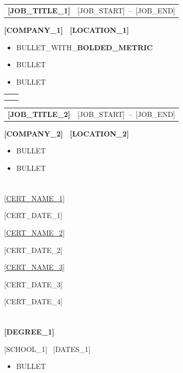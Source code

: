 \documentclass[10pt,a4paper]{article}
\makeatletter
\newenvironment{compactitem}{%
  \begin{itemize}
  \setlength{\itemsep}{2pt}\setlength{\topsep}{2pt}%
  \setlength{\parsep}{0pt}\setlength{\partopsep}{0pt}%
  \setlength{\leftmargin}{12pt}
}{\end{itemize}}
\newcommand{\entryrow}[2]{%
  \noindent\begin{tabularx}{\linewidth}{@{}X r@{}}
  {\fontsize{10}{12}\selectfont\bfseries #1} & {\fontsize{8.5}{10}\selectfont\color{graytext}#2}
  \end{tabularx}\par\vspace{1pt}}
\newcommand{\entrysub}[1]{{\fontsize{9}{11}\selectfont\bfseries\color{accent}#1}\par\vspace{3pt}}
\newcommand{\certrow}[4]{\noindent
  \begin{minipage}[t]{0.48\linewidth}
    {\fontsize{9}{11}\selectfont #1}\par
    {\fontsize{8.5}{10}\selectfont\color{graytext}#2}
  \end{minipage}\hfill
  \begin{minipage}[t]{0.48\linewidth}
    {\fontsize{9}{11}\selectfont #3}\par
    {\fontsize{8.5}{10}\selectfont\color{graytext}#4}
  \end{minipage}\par\vspace{6pt}}
\newcommand{\awardbox}[2]{%
  \vspace{4pt}\noindent
  \begin{tabular}{@{}>{\columncolor{accent}}p{2pt}>{\columncolor{awardbg}}p{\dimexpr\linewidth-2pt-3\tabcolsep}@{}}
   & \begin{minipage}[t]{\dimexpr\linewidth-2pt-3\tabcolsep}
       \vspace{4pt}{\fontsize{9}{11}\selectfont\bfseries\color{accent}#1}\\[2pt]
       {\fontsize{8.5}{10}\selectfont #2}\vspace{4pt}
     \end{minipage}\\
  \end{tabular}\vspace{4pt}}
\makeatother
\begin{document}
\section{}

\entryrow{[JOB_TITLE_1]}{[JOB_START]~--~[JOB_END]}
\entrysub{[COMPANY_1] \color{graytext}\textbullet\ [LOCATION_1]}
\begin{compactitem}
  \item [BULLET_WITH_\textbf{BOLDED_METRIC}]
  \item [BULLET]
  \item [BULLET]
\end{compactitem}

\awardbox{[AWARD_TITLE]}{[AWARD_TEXT]}

\vspace{8pt}
\entryrow{[JOB_TITLE_2]}{[JOB_START]~--~[JOB_END]}
\entrysub{[COMPANY_2] \color{graytext}\textbullet\ [LOCATION_2]}
\begin{compactitem}
  \item [BULLET]
  \item [BULLET]
\end{compactitem}


\section{}
\certrow{\href{[CERT_URL_1]}{[CERT_NAME_1]}}{[CERT_DATE_1]}{\href{[CERT_URL_2]}{[CERT_NAME_2]}}{[CERT_DATE_2]}
\certrow{\href{[CERT_URL_3]}{[CERT_NAME_3]}}{[CERT_DATE_3]}{[CERT_NAME_4]}{[CERT_DATE_4]}

\section{}
{\fontsize{10}{12}\selectfont\bfseries [DEGREE_1]}\par
{\fontsize{9}{11}\selectfont\color{graytext}[SCHOOL_1] \textbullet\ [DATES_1]}
\begin{compactitem}
  \item [BULLET]
\end{compactitem}
\end{document}
